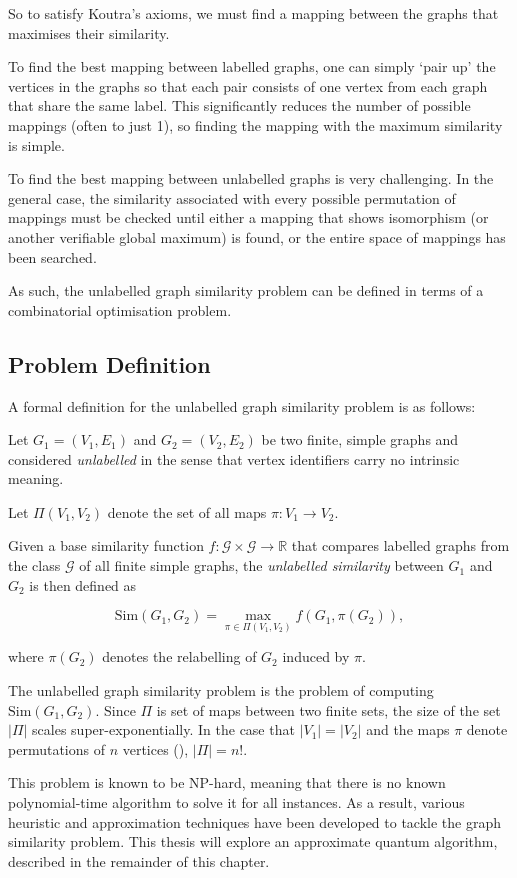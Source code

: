 So to satisfy Koutra's axioms, we must find a mapping between the graphs that maximises their similarity.

To find the best mapping between labelled graphs, one can simply `pair up' the vertices in the graphs so that each pair consists of one vertex from each graph that share the same label. This significantly reduces the number of possible mappings (often to just 1), so finding the mapping with the maximum similarity is simple.

To find the best mapping between unlabelled graphs is very challenging. In the general case, the similarity associated with every possible permutation of mappings must be checked until either a mapping that shows isomorphism (or another verifiable global maximum) is found, or the entire space of mappings has been searched.

As such, the unlabelled graph similarity problem can be defined in terms of a combinatorial optimisation problem.

\subsection{Problem Definition}
A formal definition for the unlabelled graph similarity problem is as follows:

Let $G_1=(V_1,E_1)$ and $G_2=(V_2,E_2)$ be two finite, simple graphs and considered \textit{unlabelled} in the sense that vertex identifiers carry no intrinsic meaning.

Let $\Pi(V_1,V_2)$ denote the set of all maps $\pi: V_1 \to V_2$.

Given a base similarity function $f:\mathcal{G}\times\mathcal{G}\to \mathbb{R}$ that compares labelled graphs from the class $\mathcal{G}$ of all finite simple graphs, the \textit{unlabelled similarity} between $G_1$ and $G_2$ is then defined as

$$\text{Sim}(G_1,G_2)= \max_{\pi\in\Pi(V_1,V_2)} f(G_1, \pi(G_2)),$$

where $\pi(G_2)$ denotes the relabelling of $G_2$ induced by $\pi$.

The unlabelled graph similarity problem is the problem of computing $\text{Sim}(G_1,G_2)$. Since $\Pi$ is set of maps between two finite sets, the size of the set $|\Pi|$ scales super-exponentially. In the case that $|V_1|=|V_2|$ and the maps $\pi$ denote permutations of $n$ vertices (), $|\Pi|=n!$.

This problem is known to be NP-hard, meaning that there is no known polynomial-time algorithm to solve it for all instances. As a result, various heuristic and approximation techniques have been developed to tackle the graph similarity problem. This thesis will explore an approximate quantum algorithm, described in the remainder of this chapter.

